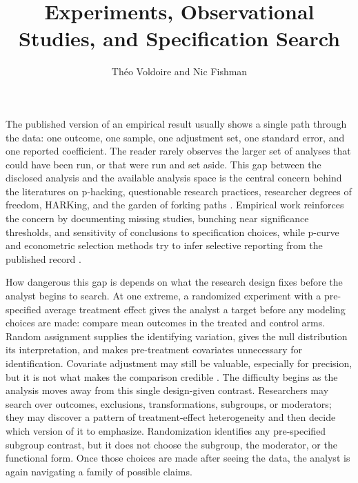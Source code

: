 \documentclass[10pt,english]{article}
\title{\vspace{-2em}Experiments, Observational Studies, and Specification Search}
\author{Théo Voldoire and Nic Fishman}
\date{}
\begin{document}
\maketitle
\vspace{-1.6em}

The published version of an empirical result usually shows a single path through the data: one outcome, one sample, one adjustment set, one standard error, and one reported coefficient. The reader rarely observes the larger set of analyses that could have been run, or that were run and set aside. This gap between the disclosed analysis and the available analysis space is the central concern behind the literatures on p-hacking, questionable research practices, researcher degrees of freedom, HARKing, and the garden of forking paths \citep{simmonsFalsePositivePsychologyUndisclosed2011,johnMeasuringPrevalenceQuestionable2012,kerr1998harking,gelmanLoken2013,head2015extent,wicherts2016degrees}. Empirical work reinforces the concern by documenting missing studies, bunching near significance thresholds, and sensitivity of conclusions to specification choices, while p-curve and econometric selection methods try to infer selective reporting from the published record \citep{franco2014publication,brodeur2016star,brodeur2020methods,vivalt2019specification,jerke2025publication,simonsohnPCurveKeyFileDrawer2014,brunsIoannidis2016pcurve,andrews2019identification,elliott2022detecting}.

How dangerous this gap is depends on what the research design fixes before the analyst begins to search. At one extreme, a randomized experiment with a pre-specified average treatment effect gives the analyst a target before any modeling choices are made: compare mean outcomes in the treated and control arms. Random assignment supplies the identifying variation, gives the null distribution its interpretation, and makes pre-treatment covariates unnecessary for identification. Covariate adjustment may still be valuable, especially for precision, but it is not what makes the comparison credible \citep{lin2013agnostic}. The difficulty begins as the analysis moves away from this single design-given contrast. Researchers may search over outcomes, exclusions, transformations, subgroups, or moderators; they may discover a pattern of treatment-effect heterogeneity and then decide which version of it to emphasize. Randomization identifies any pre-specified subgroup contrast, but it does not choose the subgroup, the moderator, or the functional form. Once those choices are made after seeing the data, the analyst is again navigating a family of possible claims.
\end{document}
